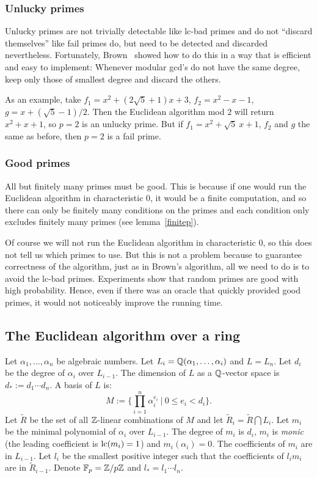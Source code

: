 \documentclass[10pt]{article}
\newcommand{\Q}{\QQ}
\newcommand{\Z}{\ZZ}
\newcommand{\Fp}{{\mathbb F}_p}
\newcommand{\degr}{d}
\newcommand{\minp}{m}
\newcommand{\bad}{lc-bad }
\begin{document}
\subsubsection{Unlucky primes}
Unlucky primes are not trivially detectable like \bad primes
and do not ``discard themselves'' like fail primes do, but
need to be detected and discarded nevertheless.
Fortunately, Brown~\cite{Brown} showed how to do this in
a way that is efficient and easy to
implement: Whenever modular gcd's do not have the
same degree, keep only those of smallest degree
and discard the others.

As an example, take $f_1 = x^2+(2\sqrt{5}+1)x+3$, $f_2 = x^2-x-1$,
$g = x + (\sqrt{5}-1)/2$. Then the Euclidean algorithm mod $2$
will return $x^2+x+1$, so $p=2$ is an unlucky prime.
But if $f_1 = x^2 + \sqrt{5}\ x + 1$, $f_2$ and $g$ the same as before,
then $p=2$ is a fail prime.

\subsubsection{Good primes}
\label{goodprimes}
All but finitely many primes must be good. This is because
if one would run the Euclidean algorithm in characteristic 0,
it would be a finite computation, and so there can only be finitely
many conditions on the primes and each condition only excludes
finitely many primes (see lemma~\ref{finitep}).





Of course we will not run the Euclidean algorithm
in characteristic 0, so this does not tell us which primes to use.
But this is not a problem because
to guarantee correctness of the
algorithm, just as in Brown's algorithm,
all we need to do is to avoid the \bad primes.
Experiments show that random primes are good with high probability. Hence,
even if there was an oracle that quickly provided good primes, it would not
noticeably improve the running time.
 \subsection{The Euclidean algorithm over a ring}
\label{sectionEucl}
Let $\alpha_1,\ldots,\alpha_n$ be algebraic numbers.
Let $L_i = \Q(\alpha_1,\ldots,\alpha_i)$ and $L=L_n$.
Let $\degr_i$ be the degree of $\alpha_i$ over
$L_{i-1}$.
The dimension of $L$ as a $\Q$-vector space is $\degr_* :=
\degr_1\cdots \degr_n$.
A basis of $L$ is:
\[
	M := \{ \prod_{i=1}^n \alpha_i^{e_i}\ \vert \ 0 \leq e_i < \degr_i \}.
\]
Let $\tilde{R}$ be the set of all $\Z$-linear combinations of $M$
and let $\tilde{R}_i = \tilde{R} \bigcap L_i$.
Let $\minp_i$ be the minimal polynomial of $\alpha_i$
over $L_{i-1}$. The degree of $\minp_i$ is $\degr_i$, $\minp_i$ is {\em monic} (the leading
coefficient is ${\rm lc}(\minp_i)=1$)
and $\minp_i(\alpha_i)=0$.
The coefficients of $\minp_i$ are in $L_{i-1}$.
Let $l_i$ be the smallest positive integer such that the coefficients
of $l_i \minp_i$ are in $\tilde{R}_{i-1}$.
Denote $\Fp = \Z/p\Z$ and $l_* = l_1\cdots l_n$.
\end{document}
